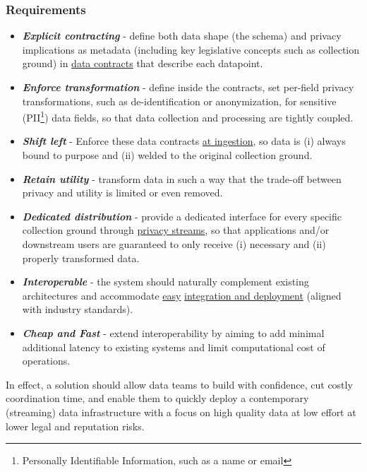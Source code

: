 \documentclass[11pt]{article} %
\begin{document}
\subsubsection{Requirements}
\begin{itemize}
  \item \textbf{\textit{Explicit contracting}} - define both data shape (the schema) and privacy implications as metadata (including key legislative concepts such as collection ground) in \underline{data contracts} that describe each datapoint. 
    \item \textbf{\textit{Enforce transformation}} - define %
    inside the contracts, set per-field privacy transformations, such as de-identification or anonymization, for sensitive (PII\footnote{Personally Identifiable Information, such as a name or email}) data fields, so that data collection and processing are tightly coupled. 
  \item \textbf{\textit{Shift left}} - Enforce these data contracts \underline{at ingestion}, so data is (i) always bound to purpose and (ii) welded to the original collection ground.
  \item \textbf{\textit{Retain utility}} - transform data in such a way that the trade-off between privacy and utility is limited or even removed. 
  \item \textbf{\textit{Dedicated distribution}} - provide a dedicated interface for every specific collection ground through \underline{privacy streams}, so that applications and/or downstream users are guaranteed to only receive (i) necessary and (ii) properly transformed data.
  \item \textbf{\textit{Interoperable}} - the system should naturally complement existing architectures and accommodate \underline{easy} \underline{integration and deployment}
   (aligned with industry standards). 
  \item \textbf{\textit{Cheap and Fast}} - extend interoperability by aiming to add minimal additional latency to existing systems and limit computational cost of operations.  
\end{itemize}

In effect, a solution should allow data teams to build with confidence, cut costly coordination time, and enable them to quickly deploy a contemporary (streaming) data infrastructure with a focus on high quality data at low effort at lower legal and reputation risks. 


\end{document}
